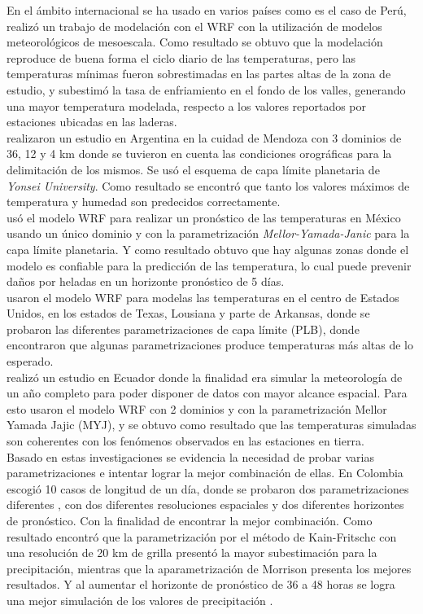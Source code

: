 \documentclass[11pt]{article}
\begin{document}
En el ámbito internacional se ha usado en varios países como es el caso de Perú, \citet{Saavedra2016} realizó un trabajo de modelación con el WRF con la utilización de modelos meteorológicos de mesoescala. Como resultado se obtuvo que la modelación reproduce de buena forma el ciclo diario de las temperaturas, pero las temperaturas mínimas fueron sobrestimadas en las partes altas de la zona de estudio, y subestimó la tasa de enfriamiento en el fondo de los valles, generando una mayor temperatura modelada, respecto a los valores reportados por estaciones ubicadas en las laderas.\\

\citet{Fernandez2011} realizaron un estudio en Argentina en la cuidad de Mendoza con 3 dominios de 36, 12 y 4 km donde se tuvieron en cuenta las condiciones orográficas para la delimitación de los mismos. Se usó el esquema de capa límite planetaria de \textit{Yonsei University}. Como resultado se encontró que tanto los valores máximos de temperatura y humedad son predecidos correctamente.\\

\citet{Corrales2015a} usó el modelo WRF para realizar un pronóstico de las temperaturas en México usando un único dominio y con la parametrización \textit{Mellor-Yamada-Janic} para la capa límite planetaria. Y como resultado obtuvo que hay algunas zonas donde el modelo es confiable para la predicción de las temperatura, lo cual puede prevenir daños por heladas en un horizonte pronóstico de 5 días.\\

\citet{Hu2010} usaron el modelo WRF para modelas las temperaturas en el centro de Estados Unidos, en los estados de Texas, Lousiana y parte de Arkansas, donde se probaron las diferentes parametrizaciones de capa límite (PLB), donde encontraron que algunas parametrizaciones produce temperaturas más altas de lo esperado.\\

\citet{Parra2012} realizó un estudio en Ecuador donde la finalidad era simular la meteorología de un año completo para poder disponer de datos con mayor alcance espacial. Para esto usaron el modelo WRF con 2 dominios y con la parametrización Mellor Yamada Jajic (MYJ), y se obtuvo como resultado que las temperaturas simuladas son coherentes con los fenómenos observados en las estaciones en tierra.\\


Basado en estas investigaciones se evidencia la necesidad de probar varias parametrizaciones e intentar lograr la mejor combinación de ellas. En Colombia \citet{Uribe2012} escogió 10 casos de longitud de un día, donde se probaron dos parametrizaciones diferentes , con dos diferentes resoluciones espaciales y dos diferentes horizontes de pronóstico. Con la finalidad de encontrar la mejor combinación. Como resultado encontró que la parametrización por el método de Kain-Fritschc con una resolución de 20 km de grilla presentó la mayor subestimación para la precipitación, mientras que la aparametrización de Morrison presenta los mejores resultados. Y al aumentar el horizonte de pronóstico de 36 a 48 horas se logra una mejor simulación de los valores de precipitación \citep{Uribe2012}.\\
\end{document}
